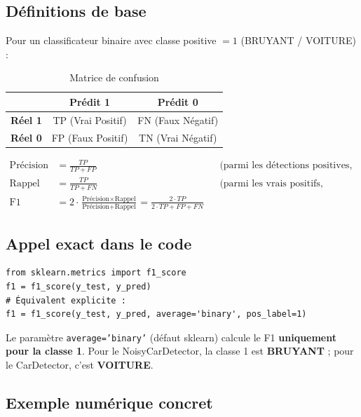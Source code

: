 \documentclass[11pt,a4paper]{article}
\newcommand{\param}[1]{\texttt{#1}}
\begin{document}
\subsection{Définitions de base}

Pour un classificateur binaire avec classe positive $= 1$ (BRUYANT / VOITURE) :

\begin{table}[h!]
\centering
\renewcommand{\arraystretch}{1.4}
\begin{tabular}{l|cc}
\toprule
 & \textbf{Prédit 1} & \textbf{Prédit 0} \\
\midrule
\textbf{Réel 1} & TP (Vrai Positif)  & FN (Faux Négatif) \\
\textbf{Réel 0} & FP (Faux Positif)  & TN (Vrai Négatif) \\
\bottomrule
\end{tabular}
\caption{Matrice de confusion}
\end{table}

\begin{align}
\text{Précision} &= \frac{TP}{TP + FP}
    &&\text{(parmi les détections positives, combien sont correctes ?)} \\[6pt]
\text{Rappel} &= \frac{TP}{TP + FN}
    &&\text{(parmi les vrais positifs, combien sont détectés ?)} \\[6pt]
\text{F1} &= 2 \cdot \frac{\text{Précision} \times \text{Rappel}}{\text{Précision} + \text{Rappel}}
    = \frac{2 \cdot TP}{2 \cdot TP + FP + FN}
\end{align}

\subsection{Appel exact dans le code}

\begin{lstlisting}
from sklearn.metrics import f1_score
f1 = f1_score(y_test, y_pred)
# Équivalent explicite :
f1 = f1_score(y_test, y_pred, average='binary', pos_label=1)
\end{lstlisting}

Le paramètre \param{average='binary'} (défaut sklearn) calcule le F1
\textbf{uniquement pour la classe 1}. Pour le NoisyCarDetector, la classe 1
est \textbf{BRUYANT} ; pour le CarDetector, c'est \textbf{VOITURE}.

\subsection{Exemple numérique concret}
\end{document}
